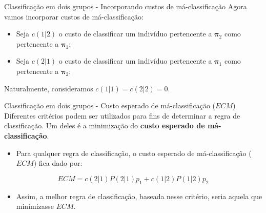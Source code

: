\documentclass[
  ignorenonframetext,
  aspectratio=169,
]{beamer}
\providecommand{\tightlist}{%
  \setlength{\itemsep}{0pt}\setlength{\parskip}{0pt}}
\begin{document}
\begin{frame}{Classificação em dois grupos - Incorporando custos de
má-classificação}
\label{classificauxe7uxe3o-em-dois-grupos---incorporando-custos-de-muxe1-classificauxe7uxe3o}
Agora vamos incorporar custos de má-classificação:

\begin{itemize}
\tightlist
\item
  Seja \(c(1|2)\) o custo de classificar um indivíduo pertencente a
  \(\boldsymbol{\pi}_2\) como pertencente a \(\boldsymbol{\pi}_1\);
\end{itemize}

\pause

\begin{itemize}
\tightlist
\item
  Seja \(c(2|1)\) o custo de classificar um indivíduo pertencente a
  \(\boldsymbol{\pi}_1\) como pertencente a \(\boldsymbol{\pi}_2\);
\end{itemize}

\pause

Naturalmente, consideramos \(c(1|1) = c(2|2) = 0\).
\end{frame}

\begin{frame}{Classificação em dois grupos - Custo esperado de
má-classificação (\(ECM\))}
\label{classificauxe7uxe3o-em-dois-grupos---custo-esperado-de-muxe1-classificauxe7uxe3o-ecm}
Diferentes critérios podem ser utilizados para fins de determinar a
regra de classificação. Um deles é a minimização do \textbf{custo
esperado de má-classificação}.

\begin{itemize}
\tightlist
\item
  Para qualquer regra de classificação, o custo esperado de
  má-classificação (\(ECM\)) fica dado por:
\end{itemize}

\[ECM = c(2|1)P(2|1)p_1 + c(1|2)P(1|2)p_2\]

\begin{itemize}
\tightlist
\item
  Assim, a melhor regra de classificação, baseada nesse critério, seria
  aquela que minimizasse \(ECM\).
\end{itemize}
\end{frame}
\end{document}
